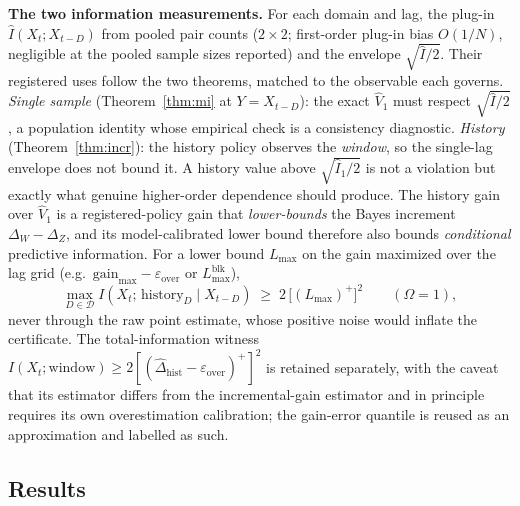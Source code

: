 \documentclass[acmsmall,screen,review,anonymous]{acmart}
\begin{document}
\textbf{The two information measurements.} For each domain and lag, the
plug-in $\widehat I(X_t;X_{t-D})$ from pooled pair counts ($2{\times}2$;
first-order plug-in bias $O(1/N)$, negligible at the pooled sample sizes
reported) and the envelope $\sqrt{\widehat I/2}$. Their registered uses
follow the two theorems, matched to the observable each governs.
\emph{Single sample} (Theorem~\ref{thm:mi} at $Y=X_{t-D}$): the exact
$\widehat V_1$ must respect $\sqrt{\widehat I/2}$, a population identity
whose empirical check is a consistency diagnostic. \emph{History}
(Theorem~\ref{thm:incr}): the history policy observes the \emph{window},
so the single-lag envelope does not bound it. A history value above
$\sqrt{\widehat I_1/2}$ is not a violation but exactly what genuine
higher-order dependence should produce. The history gain over
$\widehat V_1$ is a registered-policy gain that \emph{lower-bounds} the
Bayes increment $\Delta_W-\Delta_Z$, and its model-calibrated lower
bound therefore also bounds \emph{conditional} predictive information.
For a lower bound $L_{\max}$ on the gain maximized over the lag grid
(e.g.\ $\text{gain}_{\max}-\varepsilon_{\mathrm{over}}$ or $L^{\mathrm{blk}}_{\max}$),
\[
\max_{D\in\mathcal D}I(X_t;\,\text{history}_D\mid X_{t-D})\;\ge\;
2\,\bigl[(L_{\max})^{+}\bigr]^{2}\qquad(\Omega=1),
\]
never through the raw point estimate, whose positive noise would inflate
the certificate. The total-information witness
$I(X_t;\text{window})\ge2[(\widehat\Delta_{\mathrm{hist}}
-\varepsilon_{\mathrm{over}})^{+}]^{2}$ is retained separately, with the
caveat that its estimator differs from the incremental-gain estimator and
in principle requires its own overestimation calibration; the gain-error
quantile is reused as an approximation and labelled as such.

\subsection{Results}
\end{document}
